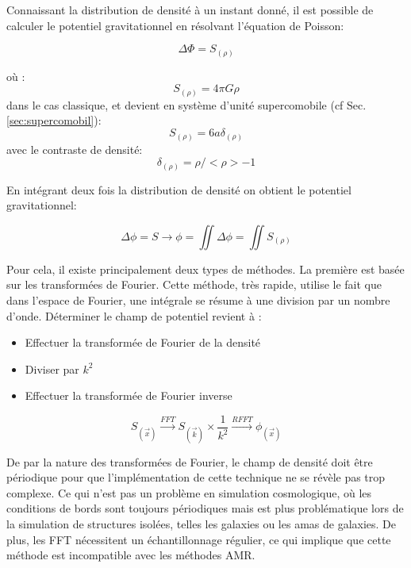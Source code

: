 Connaissant la distribution de densité à un instant donné, il est possible de calculer le potentiel gravitationnel en résolvant l'équation de Poisson:

\begin{equation}
\Delta \Phi = S_{(\rho)}
\end{equation}

où :
\begin{equation}
S_{(\rho)} = 4 \pi G \rho
\end{equation}
dans le cas classique, et devient en système d'unité supercomobile (cf Sec. \ref{sec:supercomobil}):
\begin{equation}
S_{(\rho)} = 6 a \delta_{(\rho)}
\end{equation}
avec le contraste de densité: 
\begin{equation}
\delta_{(\rho)} = \rho / < \rho > - 1 
\end{equation}

En intégrant deux fois la distribution de densité on obtient le potentiel gravitationnel:

\begin{equation}
\Delta \phi = S \longrightarrow \phi = \iint \Delta \phi = \iint S_{(\rho)}
\end{equation}

Pour cela, il existe principalement deux types de méthodes. 
La première est basée sur les transformées de Fourier. 
Cette méthode, très rapide, utilise le fait que dans l'espace de Fourier, une intégrale se résume à une division par un nombre d'onde. 
Déterminer le champ de potentiel revient à : 
\begin{itemize}
\item Effectuer la transformée de Fourier de la densité
\item Diviser par $k^2$
\item Effectuer la transformée de Fourier inverse
\end{itemize}

\begin{equation}
S_{(\vec{x})} \overset{FFT}{\longrightarrow}  S_{(\vec{k})} \times \frac{1}{k^2}  \overset{RFFT}{\longrightarrow}  \phi_{(\vec{x})}
\end{equation}

De par la nature des transformées de Fourier, le champ de densité doit être périodique pour que l'implémentation de cette technique ne se révèle pas trop complexe. 
Ce qui n'est pas un problème en simulation cosmologique, où les conditions de bords sont toujours périodiques mais est plus problématique lors de la simulation de structures isolées, telles les galaxies ou les amas de galaxies. 
De plus, les \ac{FFT} nécessitent un échantillonnage régulier, ce qui implique que cette méthode est incompatible avec les méthodes \ac{AMR}. 

